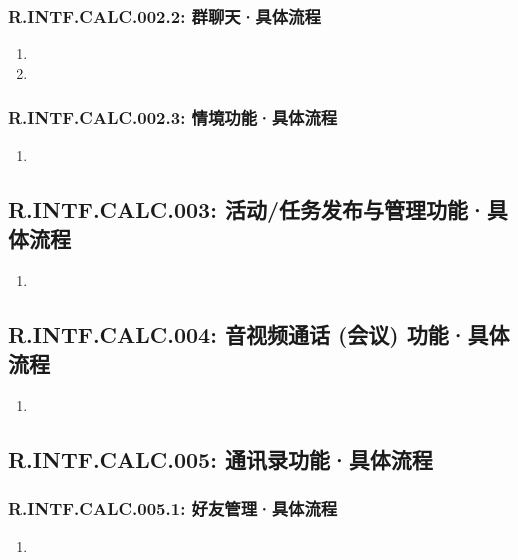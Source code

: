         \subsubsection{R.INTF.CALC.002.2: 群聊天·具体流程}
        \begin{enumerate}
            \item 
            \item
        \end{enumerate}
        \subsubsection{R.INTF.CALC.002.3: 情境功能·具体流程}
        \begin{enumerate}
            \item 
        \end{enumerate}
    \subsection{R.INTF.CALC.003: 活动/任务发布与管理功能·具体流程}
    \begin{enumerate}
        \item 
    \end{enumerate}
    \subsection{R.INTF.CALC.004: 音视频通话 (会议) 功能·具体流程}
    \begin{enumerate}
        \item 
    \end{enumerate}
    \subsection{R.INTF.CALC.005: 通讯录功能·具体流程}
        \subsubsection{R.INTF.CALC.005.1: 好友管理·具体流程}
        \begin{enumerate}
            \item 
        \end{enumerate}
